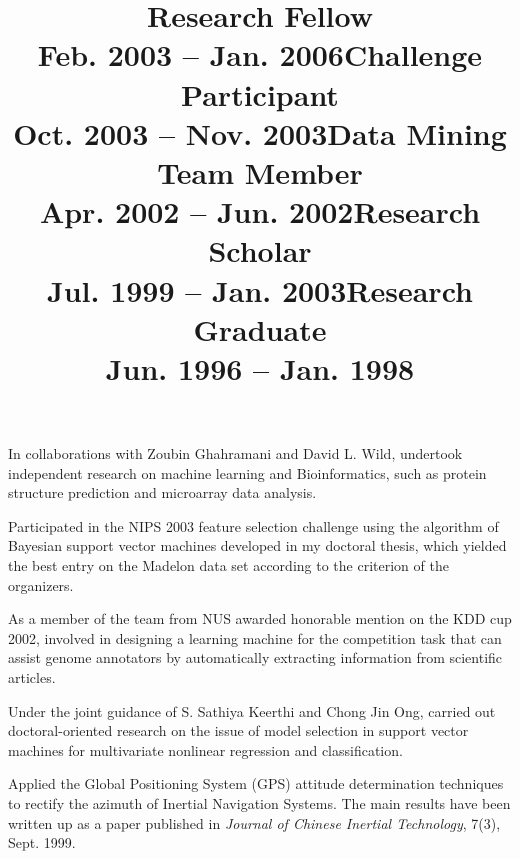 \documentclass[line,10pt,final]{res}
\begin{document}
\begin{resume}
{\title{\bf Research Fellow \\ \bf Feb. 2003 -- Jan. 2006} 
 \location{}
\dates{}
\begin{position}
In collaborations with Zoubin Ghahramani and David L. Wild,
undertook independent research on machine learning and
Bioinformatics, such as protein structure prediction and
microarray data analysis.
\end{position}

\title{\bf Challenge Participant\\ \bf Oct. 2003 -- Nov. 2003}
 \location{}
\dates{}
\begin{position}
Participated in the NIPS 2003 feature selection challenge using
the algorithm of Bayesian support vector machines developed in my
doctoral thesis, which yielded the best entry on the Madelon data
set according to the criterion of the organizers.
\end{position}

\title{\bf Data Mining Team Member \\ \bf Apr. 2002 -- Jun. 2002}
 \location{}
\dates{}
\begin{position}
As a member of the team from NUS awarded honorable mention on the
KDD cup 2002, involved in designing a learning machine for the
competition task that can assist genome annotators by
automatically extracting information from scientific articles.
\end{position}

\title{\bf Research Scholar \\ \bf Jul. 1999 -- Jan. 2003}
 \location{}
\dates{}
\begin{position}
Under the joint guidance of S. Sathiya Keerthi and Chong Jin Ong,
carried out doctoral-oriented research on the issue of model
selection in support vector machines for multivariate nonlinear
regression and classification.
\end{position}

\title{\bf Research Graduate \\ \bf Jun. 1996 -- Jan. 1998}
 \location{}
\dates{}
\begin{position}
Applied the Global Positioning System (GPS) attitude determination
techniques to rectify the azimuth of Inertial Navigation Systems.
The main results have been written up as a paper published in {\em
Journal of Chinese Inertial Technology}, 7(3), Sept. 1999.
\end{position}

}
\end{resume}
\end{document}
